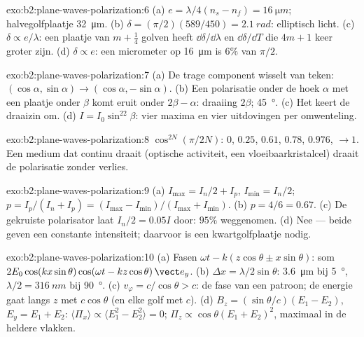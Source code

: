 \begin{solution}{exo:b2:plane-waves-polarization:6}
(a) $e = \lambda/4(n_s - n_f) = \qty{16}{\micro m}$; halvegolfplaatje
\qty{32}{\micro m}. (b) $\delta =
(\pi/2)(589/450) = \qty{2.1}{rad}$:
elliptisch licht. (c) $\delta \propto e/\lambda$: een plaatje van
$m + \tfrac14$ golven heeft $\dd\delta/\dd\lambda$ en $\dd\delta/\dd T$ die
$4m + 1$ keer groter zijn. (d) $\delta \propto e$: een micrometer op
\qty{16}{\micro m} is $6\%$ van $\pi/2$.
\end{solution}

\begin{solution}{exo:b2:plane-waves-polarization:7}
(a) De trage component wisselt van teken:
$(\cos\alpha, \sin\alpha) \to (\cos\alpha,
-\sin\alpha)$. (b) Een
polarisatie onder de hoek $\alpha$ met een plaatje onder $\beta$ komt eruit
onder $2\beta - \alpha$: draaiing $2\beta$; \qty{45}{\degree}. (c) Het keert
de draaizin om. (d) $I = I_0\sin^22\beta$: vier maxima en vier uitdovingen
per omwenteling.
\end{solution}

\begin{solution}{exo:b2:plane-waves-polarization:8}
$\cos^{2N}(\pi/2N)$: $0$, $0.25$, $0.61$, $0.78$, $0.976$, $\to 1$. Een
medium dat continu draait (optische activiteit, een vloeibaarkristalcel)
draait de polarisatie zonder verlies.
\end{solution}

\begin{solution}{exo:b2:plane-waves-polarization:9}
(a) $I_{\max} = I_n/2 + I_p$, $I_{\min} = I_n/2$;
$p = I_p/(I_n + I_p) = (I_{\max} -
I_{\min})/(I_{\max} + I_{\min})$. (b)
$p = 4/6 = 0.67$. (c) De gekruiste polarisator laat $I_n/2 = 0.05I$ door:
$95\%$ weggenomen. (d) Nee --- beide geven een constante intensiteit;
daarvoor is een kwartgolfplaatje nodig.
\end{solution}

\begin{solution}{exo:b2:plane-waves-polarization:10}
(a) Fasen $\omega t - k(z\cos\theta \pm x\sin\theta)$: som
$2E_0\cos(kx\sin\theta)\cos(\omega t
- kz\cos\theta)\,\vect e_y$. (b)
$\Delta x = \lambda/2\sin\theta$: \qty{3.6}{\micro m} bij \qty{5}{\degree},
$\lambda/2 = \qty{316}{nm}$ bij \qty{90}{\degree}. (c)
$v_\varphi = c/\cos\theta > c$: de fase van een patroon; de energie gaat
langs $z$ met $c\cos\theta$ (en elke golf met $c$). (d)
$B_z = (\sin\theta/c)(E_1 - E_2)$, $E_y = E_1 + E_2$:
$\langle\Pi_x\rangle \propto
\langle E_1^2 - E_2^2\rangle = 0$;
$\Pi_z \propto \cos\theta(E_1 + E_2)^2$, maximaal in de heldere vlakken.
\end{solution}

